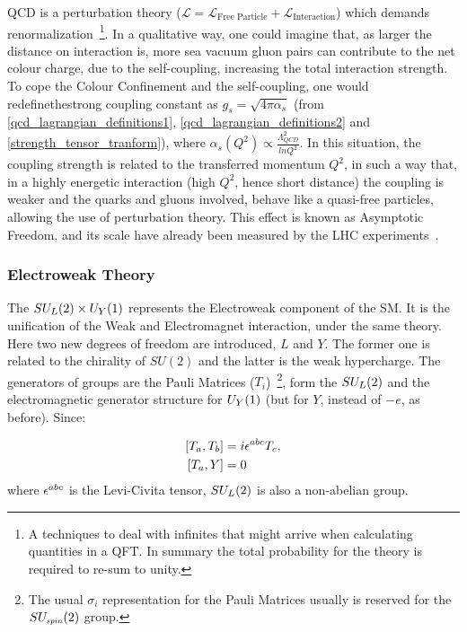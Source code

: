 QCD is a perturbation theory ($\mathcal{L} = \mathcal{L}_{\text{Free Particle}} + \mathcal{L}_{\text{Interaction}}$) which demands renormalization~\footnote{A techniques to deal with infinites that might arrive when calculating quantities in a QFT. In summary the total probability for the theory is required to re-sum to unity.}. In a qualitative way, one could imagine that, as larger the distance on interaction is, more sea vacuum gluon pairs can contribute to the net colour charge, due to the self-coupling, increasing the total interaction strength. To cope the Colour Confinement and the self-coupling, one would redefinethestrong coupling constant as $g_s = \sqrt{4 \pi \alpha_s}$ (from \ref{qcd_lagrangian_definitions1}, \ref{qcd_lagrangian_definitions2} and \ref{strength_tensor_tranform}), where $\alpha_s(Q^2) \propto \frac{\Lambda^2_{QCD}}{ln Q^2}$. In this situation, the coupling strength is related to the transferred momentum $Q^2$, in such a way that, in a highly energetic interaction (high $Q^2$, hence short distance) the coupling is weaker and the quarks and gluons involved, behave like a quasi-free particles, allowing the use of perturbation theory. This effect is known as Asymptotic Freedom, and its scale have already been measured by the LHC experiments~\cite{pdg_2020}.

\subsubsection{Electroweak Theory}

The $SU_{\scaleto{L}{5pt}}(2) \times U_{\scaleto{Y}{5pt}}(1)$ represents the Electroweak component of the SM. It is the unification of the Weak and Electromagnet interaction, under the same theory. Here two new degrees of freedom are introduced, $L$ and $Y$. The former one is related to the chirality of $SU(2)$ and the latter is the weak hypercharge. The generators of groups are the Pauli Matrices ($T_i$)~\footnote{The usual $\sigma_i$ representation for the Pauli Matrices usually is reserved for the $SU_{\scaleto{spin}{5pt}}(2)$ group.}, form the $SU_{\scaleto{L}{5pt}}(2)$ and the electromagnetic generator structure for $U_{\scaleto{Y}{5pt}}(1)$ (but for $Y$, instead of $-e$, as before). Since:

\begin{equation}
    \begin{split}
        \left[ T_a, T_b \right] &=  i \levicivita{^{abc}}T_c,  \\
        \left[ T_a, Y \right] &=  0
    \end{split}
\label{pauli_commutator}
\end{equation}
where $\levicivita{^{abc}}$ is the Levi-Civita tensor, $SU_{\scaleto{L}{5pt}}(2)$ is also a non-abelian group.

